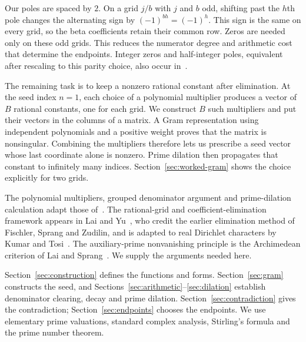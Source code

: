 Our poles are spaced by $2$. On a grid $j/b$ with $j$ and $b$
odd, shifting past the $h$th pole changes the alternating sign
by $(-1)^{bh}=(-1)^h$. This sign is the same on every grid,
so the beta coefficients retain their common row.
Zeros are needed only on these odd grids. This reduces the
numerator degree and arithmetic cost that determine the endpoints.
Integer zeros and half-integer poles, equivalent after rescaling
to this parity choice, also occur in~\cite{K26}.

The remaining task is to keep a nonzero rational constant after
elimination. At the seed index $n=1$, each choice of a polynomial
multiplier produces a vector of $B$ rational constants, one for
each grid. We construct $B$ such multipliers and put their vectors
in the columns of a matrix. A Gram representation using independent
polynomials and a positive weight proves that the matrix is
nonsingular. Combining the multipliers therefore lets us prescribe
a seed vector whose last coordinate alone is nonzero. Prime
dilation then propagates that constant to infinitely many indices.
Section~\ref{sec:worked-gram} shows the choice explicitly for two grids.

The polynomial multipliers, grouped denominator argument and
prime-dilation calculation adapt those of~\cite{Tcount}.
The rational-grid and coefficient-elimination framework appears
in Lai and Yu~\cite[Sections~2 and~5]{LY20}, who credit the earlier
elimination method of Fischler, Sprang and Zudilin, and is adapted
to real Dirichlet characters by Kumar and Tosi~\cite[Section~2]{KT26}.
The auxiliary-prime nonvanishing principle is the Archimedean
criterion of Lai and Sprang~\cite[Lemma~2.3]{LS25}.
We supply the arguments needed here.

Section~\ref{sec:construction} defines the functions and forms.
Section~\ref{sec:gram} constructs the seed, and
Sections~\ref{sec:arithmetic}--\ref{sec:dilation} establish
denominator clearing, decay and prime dilation.
Section~\ref{sec:contradiction} gives the contradiction;
Section~\ref{sec:endpoints} chooses the endpoints.
We use elementary prime valuations, standard complex analysis,
Stirling's formula and the prime number theorem.
